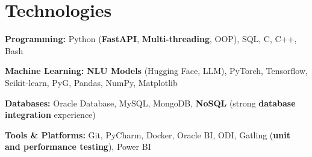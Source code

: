 \section{Technologies}
       
        \begin{onecolentry}
            \textbf{Programming:} Python (\textbf{FastAPI}, \textbf{Multi-threading}, OOP), SQL, C, C++, Bash
        \end{onecolentry}

        \vspace{0.2 cm}

        \begin{onecolentry}
            \textbf{Machine Learning:} \textbf{NLU Models} (Hugging Face, LLM), PyTorch, Tensorflow, Scikit-learn, PyG, Pandas, NumPy, Matplotlib
        \end{onecolentry}

        \vspace{0.2 cm}

        \begin{onecolentry}
            \textbf{Databases:} Oracle Database, MySQL, MongoDB, \textbf{NoSQL} (strong \textbf{database integration} experience)
        \end{onecolentry}

        \vspace{0.2 cm}

        \begin{onecolentry}
            \textbf{Tools & Platforms:} Git, PyCharm, Docker, Oracle BI, ODI, Gatling (\textbf{unit and performance testing}), Power BI
        \end{onecolentry}